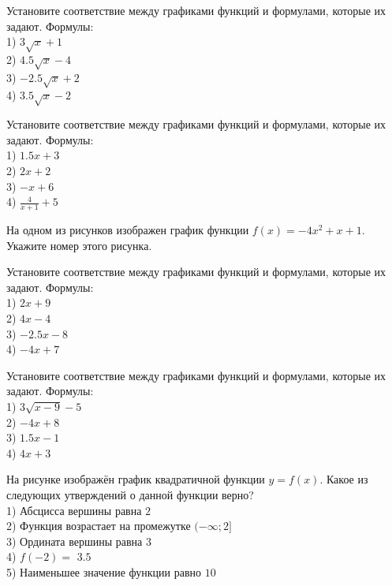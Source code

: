 \documentclass[4apaper]{article}
\begin{document}
\begin{taskBN}{43}
Установите соответствие между графиками функций и формулами, которые их задают. Формулы: \\1) $3\sqrt{x}+1$\\2) $4.5\sqrt{x}-4$\\3) $-2.5\sqrt{x}+2$\\4) $3.5\sqrt{x}-2$
\end{taskBN}

\begin{taskBN}{44}
Установите соответствие между графиками функций и формулами, которые их задают. Формулы: \\1) $1.5x+3$\\2) $2x+2$\\3) $-x+6$\\4) $\frac{4}{x+1}+5$
\end{taskBN}

\begin{taskBN}{45}
На одном из рисунков изображен график функции $f(x)=-4x^2+x+1$. Укажите номер этого рисунка.
\end{taskBN}

\begin{taskBN}{46}
Установите соответствие между графиками функций и формулами, которые их задают. Формулы: \\1) $2x+9$\\2) $4x-4$\\3) $-2.5x-8$\\4) $-4x+7$
\end{taskBN}

\begin{taskBN}{47}
Установите соответствие между графиками функций и формулами, которые их задают. Формулы: \\1) $3\sqrt{x-9}-5$\\2) $-4x+8$\\3) $1.5x-1$\\4) $4x+3$
\end{taskBN}

\begin{taskBN}{48}
На рисунке изображён график квадратичной функции $y=f(x)$. Какое из следующих утверждений о данной функции верно?\\1) Абсцисса вершины равна $2$\\2) Функция возрастает на промежутке $(-\infty;2]$\\3) Ордината вершины равна $3$\\4) $f(-2)=$ $3.5$\\5) Наименьшее значение функции равно  $10$
\end{taskBN}
\end{document}
